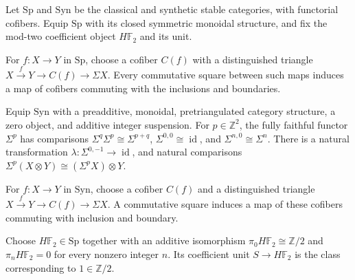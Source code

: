 \begin{definition}
\label{sem:AdamsSynthetic:categories}
Let $\mathrm{Sp}$ and $\mathrm{Syn}$ be the classical and synthetic stable categories, with functorial cofibers. Equip $\mathrm{Sp}$ with its closed symmetric monoidal structure, and fix the mod-two coefficient object $H\mathbb F_2$ and its unit.

For $f\colon X\to Y$ in $\mathrm{Sp}$, choose a cofiber $C(f)$ with a distinguished triangle $X\xrightarrow f Y\to C(f)\to\Sigma X$. Every commutative square between such maps induces a map of cofibers commuting with the inclusions and boundaries.

Equip $\mathrm{Syn}$ with a preadditive, monoidal, pretriangulated category structure, a zero object, and additive integer suspension. For $p\in\mathbb Z^2$, the fully faithful functor $\Sigma^p$ has comparisons $\Sigma^q\Sigma^p\cong\Sigma^{p+q}$, $\Sigma^{0,0}\cong\operatorname{id}$, and $\Sigma^{n,0}\cong\Sigma^n$. There is a natural transformation $\lambda\colon\Sigma^{0,-1}\to\operatorname{id}$, and natural comparisons $\Sigma^p(X\otimes Y)\cong(\Sigma^pX)\otimes Y$.

For $f\colon X\to Y$ in $\mathrm{Syn}$, choose a cofiber $C(f)$ and a distinguished triangle $X\xrightarrow f Y\to C(f)\to\Sigma X$. A commutative square induces a map of these cofibers commuting with inclusion and boundary.

Choose $H\mathbb F_2\in\mathrm{Sp}$ together with an additive isomorphism $\pi_0H\mathbb F_2\cong\mathbb Z/2$ and $\pi_nH\mathbb F_2=0$ for every nonzero integer $n$. Its coefficient unit $S\to H\mathbb F_2$ is the class corresponding to $1\in\mathbb Z/2$.


\end{definition}

